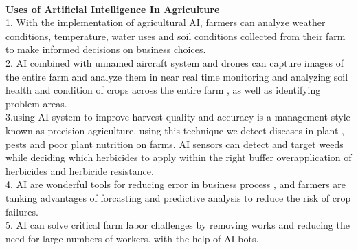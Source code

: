 \documentclass[12pt]{article}
\begin{document}
 \paragraph{}\textbf{Uses of Artificial Intelligence In Agriculture}
 \\1. With the implementation of agricultural AI, farmers can analyze weather conditions, temperature, water uses and soil conditions  collected from their farm to make informed decisions on business choices.
 \\2. AI combined with unnamed aircraft system and drones can capture images of the entire farm and analyze them in near real time  monitoring and analyzing soil health and condition of crops across the entire farm , as well as identifying problem areas.
 \\3.using AI system to improve harvest quality and accuracy is a management style known as precision agriculture. using this technique we detect diseases in plant , pests and poor plant nutrition on farms. AI sensors can detect and target weeds while deciding which herbicides to apply within the right buffer overapplication of herbicides and herbicide resistance.
 \\4. AI are wonderful tools for reducing error in business process , and farmers are tanking advantages of forcasting and predictive analysis to reduce the risk of crop failures. \\
 5. AI can solve critical farm labor challenges by removing works and reducing the need for large numbers of workers. with the help of AI bots.
\end{document}
